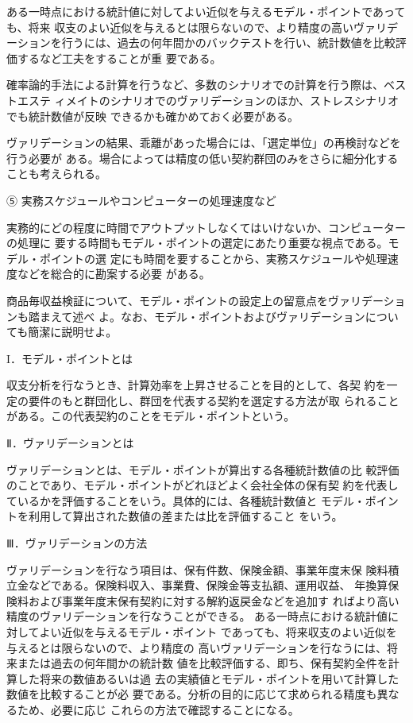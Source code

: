 \documentclass[report,gutter=10mm,fore-edge=10mm,uplatex,dvipdfmx]{jlreq}
\begin{document}
ある一時点における統計値に対してよい近似を与えるモデル・ポイントであっても、将来
収支のよい近似を与えるとは限らないので、より精度の高いヴァリデーションを行うには、過去の何年間かのバックテストを行い、統計数値を比較評価するなど工夫をすることが重
要である。

確率論的手法による計算を行うなど、多数のシナリオでの計算を行う際は、ベストエステ
ィメイトのシナリオでのヴァリデーションのほか、ストレスシナリオでも統計数値が反映
できるかも確かめておく必要がある。

ヴァリデーションの結果、乖離があった場合には、「選定単位」の再検討などを行う必要が
ある。場合によっては精度の低い契約群団のみをさらに細分化することも考えられる。

⑤ 実務スケジュールやコンピューターの処理速度など

実務的にどの程度に時間でアウトプットしなくてはいけないか、コンピューターの処理に
要する時間もモデル・ポイントの選定にあたり重要な視点である。モデル・ポイントの選
定にも時間を要することから、実務スケジュールや処理速度などを総合的に勘案する必要
がある。

商品毎収益検証について、モデル・ポイントの設定上の留意点をヴァリデーションも踏まえて述べ
よ。なお、モデル・ポイントおよびヴァリデーションについても簡潔に説明せよ。

\answer{}
I．モデル・ポイントとは

収支分析を行なうとき、計算効率を上昇させることを目的として、各契
約を一定の要件のもと群団化し、群団を代表する契約を選定する方法が取
られることがある。この代表契約のことをモデル・ポイントという。

Ⅱ．ヴァリデーションとは

ヴァリデーションとは、モデル・ポイントが算出する各種統計数値の比
較評価のことであり、モデル・ポイントがどれほどよく会社全体の保有契
約を代表しているかを評価することをいう。具体的には、各種統計数値と
モデル・ポイントを利用して算出された数値の差または比を評価すること
をいう。

Ⅲ．ヴァリデーションの方法

ヴァリデーションを行なう項目は、保有件数、保険金額、事業年度末保
険料積立金などである。保険料収入、事業費、保険金等支払額、運用収益、
年換算保険料および事業年度末保有契約に対する解約返戻金などを追加す
ればより高い精度のヴァリデーションを行なうことができる。
ある一時点における統計値に対してよい近似を与えるモデル・ポイント
であっても、将来収支のよい近似を与えるとは限らないので、より精度の
高いヴァリデーションを行なうには、将来または過去の何年間かの統計数
値を比較評価する、即ち、保有契約全件を計算した将来の数値あるいは過
去の実績値とモデル・ポイントを用いて計算した数値を比較することが必
要である。分析の目的に応じて求められる精度も異なるため、必要に応じ
これらの方法で確認することになる。
\end{document}
